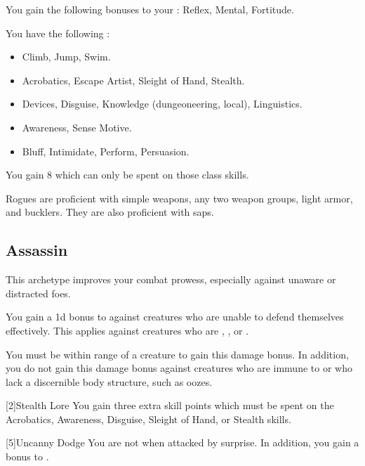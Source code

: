         You gain the following bonuses to your :  Reflex,  Mental,  Fortitude.

        You have the following :
        \begin{itemize}
            \item {} Climb, Jump, Swim.
            \item {} Acrobatics, Escape Artist, Sleight of Hand, Stealth.
            \item {} Devices, Disguise, Knowledge (dungeoneering, local), Linguistics.
            \item {} Awareness, Sense Motive.
            \item {} Bluff, Intimidate, Perform, Persuasion.
        \end{itemize}
        You gain 8  which can only be spent on those class skills.

        Rogues are proficient with simple weapons, any two weapon groups, light armor, and bucklers.
        They are also proficient with saps.

    \subsection{Assassin}
        This archetype improves your combat prowess, especially against unaware or distracted foes.

         You gain a \plus1d bonus to  against creatures who are unable to defend themselves effectively.
        This applies against creatures who are \unaware, , or .

        You must be within \rngclose range of a creature to gain this damage bonus.
        In addition, you do not gain this damage bonus against creatures who are immune to  or who lack a discernible body structure, such as oozes.

        [2]{Stealth Lore} You gain three extra skill points which must be spent on the Acrobatics, Awareness, Disguise, Sleight of Hand, or Stealth skills.

        [5]{Uncanny Dodge}
        You are not \unaware when attacked by surprise.
        In addition, you gain a  bonus to .

